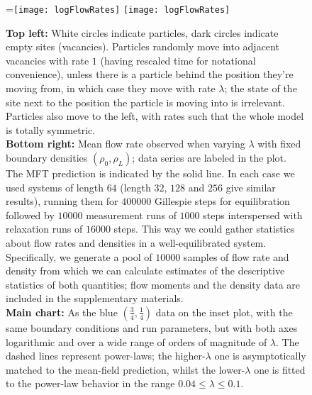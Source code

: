 \documentclass[
reprint,
 amsmath,amssymb,
 aps,
 prl,
]{revtex4-1}
\begin{document}
\begin{figure}[h!]
\vspace{1em}
\caption{\label{fig:lambdaScans} \textbf{Top left:} White circles indicate particles, dark circles indicate empty sites (vacancies). Particles randomly move into adjacent vacancies with rate $1$ (having rescaled time for notational convenience), unless there is a
particle behind the position they're moving from, in which case they move with rate $\lambda$; the state of the site next to the position the particle is moving into is irrelevant.
Particles also move to the left, with rates such that the whole model is totally symmetric.\\
\textbf{Bottom right:} Mean flow rate observed when varying $\lambda$ with fixed boundary densities $(\rho_0, \rho_L)$; data series are labeled in the plot.
The MFT prediction is indicated by the solid line.
In each case we used systems of length $64$ (length $32$, $128$ and $256$ give similar results),
running them for $400000$ Gillespie steps for equilibration followed by $10000$ measurement runs of $1000$ steps interspersed with relaxation runs of $16000$
steps. This way we could gather statistics about flow rates and densities in a well-equilibrated system. Specifically, we generate a pool of $10000$ samples of flow rate and density
from which we can calculate estimates of the descriptive statistics of both quantities; flow moments and the density data are included in the supplementary materials.\\
\textbf{Main chart:} As the blue $\left( \frac{3}{4} , \frac{1}{4} \right)$ data on the inset plot, with the same boundary conditions and run parameters, but with both axes logarithmic and over a wide range of orders of magnitude of $\lambda$.
The dashed lines represent power-laws; the higher-$\lambda$ one is asymptotically matched to the mean-field prediction, whilst the lower-$\lambda$ one is fitted to the power-law behavior in the range $0.04 \le \lambda \le 0.1$.
\vspace{1em}}
=\hbox{\texttt{[image: logFlowRates]}}
  \texttt{[image: logFlowRates]}
    \vspace{-1em}
\end{figure}
\end{document}
